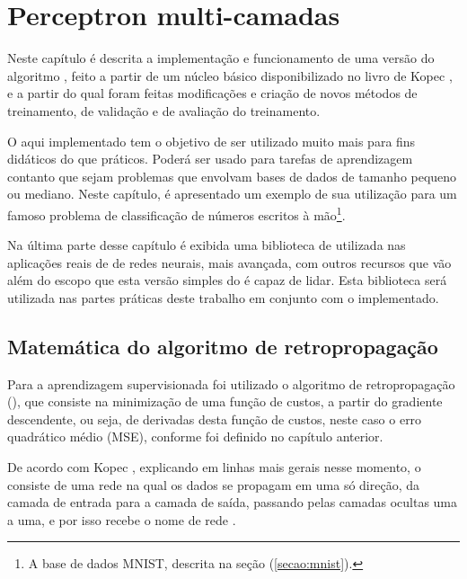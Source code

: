 
\chapter{Perceptron multi-camadas}
\label{cap:perceptron}

Neste capítulo é descrita a implementação e funcionamento de uma versão do algoritmo , feito a partir de um núcleo básico disponibilizado no livro de Kopec \citep{classic}, e a partir do qual foram feitas modificações e criação de novos métodos de treinamento, de validação e de avaliação do treinamento.

O  aqui implementado tem o objetivo de ser utilizado muito mais para fins didáticos do que práticos. Poderá ser usado para tarefas de aprendizagem contanto que sejam problemas que envolvam bases de dados de tamanho pequeno ou mediano. Neste capítulo, é apresentado um exemplo de sua utilização para um famoso problema de classificação de números escritos à mão\footnote{A base de dados MNIST, descrita na seção (\ref{secao:mnist}).}.

Na última parte desse capítulo é exibida uma biblioteca de  utilizada nas aplicações reais de  de redes neurais, mais avançada, com outros recursos que vão além do escopo que esta versão simples do  é capaz de lidar. Esta biblioteca será utilizada nas partes práticas deste trabalho em conjunto com o  implementado.

\section{Matemática do algoritmo de retropropagação}

Para a aprendizagem supervisionada foi utilizado o algoritmo de retropropagação (), que consiste na minimização de uma função de custos, a partir do gradiente descendente, ou seja, de derivadas desta função de custos, neste caso o erro quadrático médio (MSE), conforme foi definido no capítulo anterior.

De acordo com Kopec \citep{classic}, explicando em linhas mais gerais nesse momento, o  consiste de uma rede na qual os dados se propagam em uma só direção, da camada de entrada para a camada de saída, passando pelas camadas ocultas uma a uma, e por isso recebe o nome de rede . 


